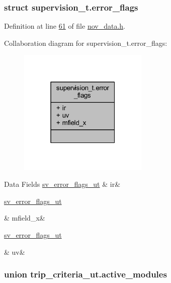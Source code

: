 \subsubsection{struct supervision\+\_\+t.\+error\+\_\+flags}


Definition at line \hyperlink{a00022_source_l00061}{61} of file \hyperlink{a00022_source}{nov\+\_\+data.\+h}.



Collaboration diagram for supervision\+\_\+t.\+error\+\_\+flags\+:\nopagebreak
\begin{figure}[H]
\begin{center}
\leavevmode
\includegraphics[width=175pt]{d1/d7a/a00982}
\end{center}
\end{figure}
\begin{DoxyFields}{Data Fields}
\hypertarget{a00022_ad74eea4899a61f9fcbc527ef988ea0ff}{\hyperlink{a00022_d2/d5a/a00792}{sv\+\_\+error\+\_\+flags\+\_\+ut}}\label{a00022_ad74eea4899a61f9fcbc527ef988ea0ff}
&
ir&
\\
\hline

\hypertarget{a00022_a46709d870ad5c3126599a53675c43291}{\hyperlink{a00022_d2/d5a/a00792}{sv\+\_\+error\+\_\+flags\+\_\+ut}}\label{a00022_a46709d870ad5c3126599a53675c43291}
&
mfield\+\_\+x&
\\
\hline

\hypertarget{a00022_a45210da832f9626829457a65e9e7c4d0}{\hyperlink{a00022_d2/d5a/a00792}{sv\+\_\+error\+\_\+flags\+\_\+ut}}\label{a00022_a45210da832f9626829457a65e9e7c4d0}
&
uv&
\\
\hline

\end{DoxyFields}
\label{d1/dea/a00829}
\hypertarget{a00022_d1/dea/a00829}{}
\subsubsection{union trip\+\_\+criteria\+\_\+ut.\+active\+\_\+modules}


